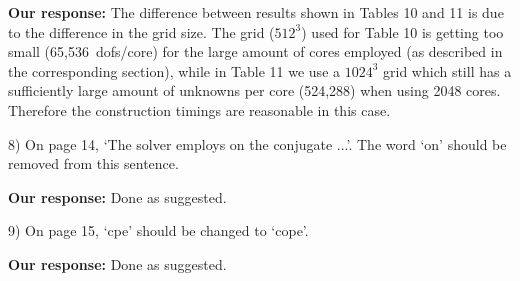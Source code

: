 \documentclass[10pt,pdftex]{report}
\begin{document}
{\textbf{Our response:}} The difference between results shown in Tables
10 and 11 is due to the difference in the grid size. The grid ($512^3$)
used for Table 10 is getting too small (65,536~dofs/core) for the
large amount of cores employed (as described in the corresponding
section), while in Table 11 we use a $1024^3$ grid which still has a
sufficiently large amount of unknowns per core (524,288) when using 2048
cores.  Therefore the construction timings are reasonable in this case.


8) On page 14, `The solver employs on the conjugate ...'. The word `on' should
be removed from this sentence.

{\textbf{Our response:}}  Done as suggested.

9) On page 15, `cpe' should be changed to `cope'.

{\textbf{Our response:}}  Done as suggested.
\end{document}
